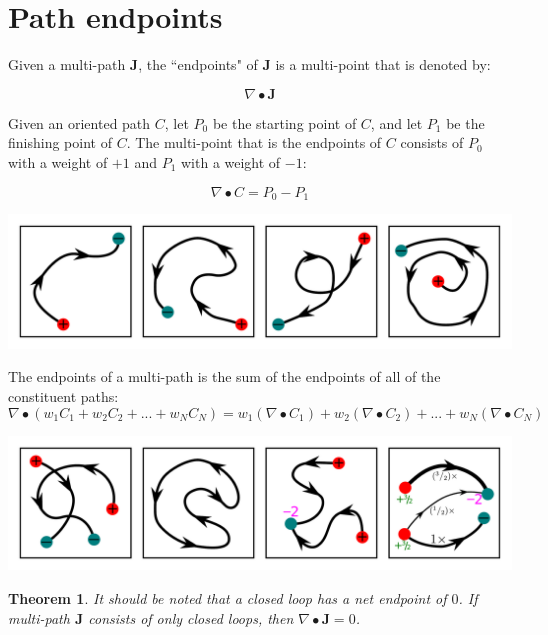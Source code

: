 \documentclass{book}
\newtheorem{thm}{Theorem}
\begin{document}
\section{Path endpoints}

Given a multi-path \(\mathbf{J}\), the ``endpoints" of \(\mathbf{J}\) is a multi-point that is denoted by:

\[\nabla \bullet \mathbf{J}\]

Given an oriented path \(C\), let \(P_0\) be the starting point of \(C\), and let \(P_1\) be the finishing point of \(C\). The multi-point that is the endpoints of \(C\) consists of \(P_0\) with a weight of \(+1\) and \(P_1\) with a weight of \(-1\):

\[\nabla \bullet C = P_0 - P_1\]

\begin{center}
\includegraphics[width = \textwidth]{Boundaries/Path_endpoints/path_endpoint_examples}
\end{center}

The endpoints of a multi-path is the sum of the endpoints of all of the constituent paths:
\[\nabla \bullet (w_1 C_1 + w_2 C_2 + ... + w_N C_N)
= w_1(\nabla \bullet C_1) + w_2(\nabla \bullet C_2) + ... + w_N(\nabla \bullet C_N)\]

\begin{center}
\includegraphics[width = \textwidth]{Boundaries/Path_endpoints/path_endpoint_examples_2}
\end{center}


\begin{thm}
It should be noted that a closed loop has a net endpoint of \(0\). If multi-path \(\mathbf{J}\) consists of only closed loops, then \(\nabla \bullet \mathbf{J} = 0\). 
\end{thm}
\end{document}
